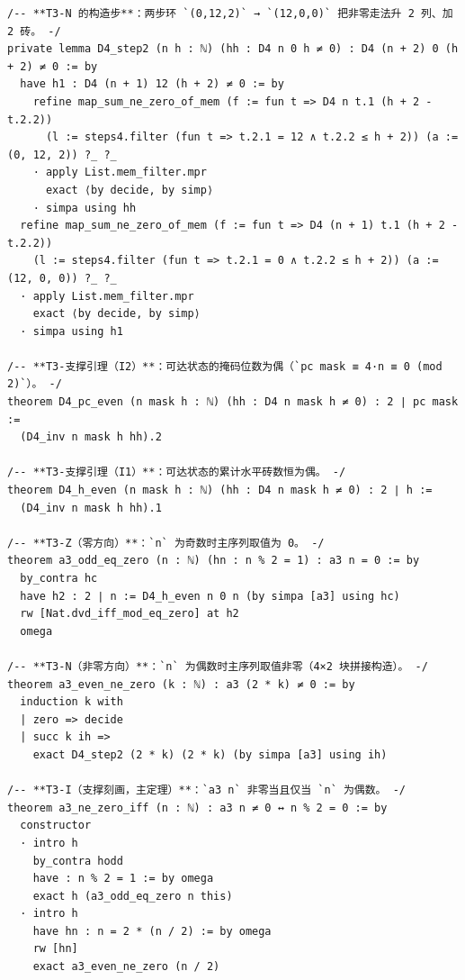 \documentclass[11pt]{article}
\begin{document}
\begin{lstlisting}[caption={Verbatim excerpt, lines 86--183 of \texttt{final/03-half4-proved.lean} (183 lines, sha256 \texttt{548f3ef5}...); the full text is in the deposit's \texttt{proofs/}.},label={lst:proof}]
/-- **T3-N 的构造步**：两步环 `(0,12,2)` → `(12,0,0)` 把非零走法升 2 列、加 2 砖。 -/
private lemma D4_step2 (n h : ℕ) (hh : D4 n 0 h ≠ 0) : D4 (n + 2) 0 (h + 2) ≠ 0 := by
  have h1 : D4 (n + 1) 12 (h + 2) ≠ 0 := by
    refine map_sum_ne_zero_of_mem (f := fun t => D4 n t.1 (h + 2 - t.2.2))
      (l := steps4.filter (fun t => t.2.1 = 12 ∧ t.2.2 ≤ h + 2)) (a := (0, 12, 2)) ?_ ?_
    · apply List.mem_filter.mpr
      exact ⟨by decide, by simp⟩
    · simpa using hh
  refine map_sum_ne_zero_of_mem (f := fun t => D4 (n + 1) t.1 (h + 2 - t.2.2))
    (l := steps4.filter (fun t => t.2.1 = 0 ∧ t.2.2 ≤ h + 2)) (a := (12, 0, 0)) ?_ ?_
  · apply List.mem_filter.mpr
    exact ⟨by decide, by simp⟩
  · simpa using h1

/-- **T3-支撑引理（I2）**：可达状态的掩码位数为偶（`pc mask ≡ 4·n ≡ 0 (mod 2)`）。 -/
theorem D4_pc_even (n mask h : ℕ) (hh : D4 n mask h ≠ 0) : 2 ∣ pc mask :=
  (D4_inv n mask h hh).2

/-- **T3-支撑引理（I1）**：可达状态的累计水平砖数恒为偶。 -/
theorem D4_h_even (n mask h : ℕ) (hh : D4 n mask h ≠ 0) : 2 ∣ h :=
  (D4_inv n mask h hh).1

/-- **T3-Z（零方向）**：`n` 为奇数时主序列取值为 0。 -/
theorem a3_odd_eq_zero (n : ℕ) (hn : n % 2 = 1) : a3 n = 0 := by
  by_contra hc
  have h2 : 2 ∣ n := D4_h_even n 0 n (by simpa [a3] using hc)
  rw [Nat.dvd_iff_mod_eq_zero] at h2
  omega

/-- **T3-N（非零方向）**：`n` 为偶数时主序列取值非零（4×2 块拼接构造）。 -/
theorem a3_even_ne_zero (k : ℕ) : a3 (2 * k) ≠ 0 := by
  induction k with
  | zero => decide
  | succ k ih =>
    exact D4_step2 (2 * k) (2 * k) (by simpa [a3] using ih)

/-- **T3-I（支撑刻画，主定理）**：`a3 n` 非零当且仅当 `n` 为偶数。 -/
theorem a3_ne_zero_iff (n : ℕ) : a3 n ≠ 0 ↔ n % 2 = 0 := by
  constructor
  · intro h
    by_contra hodd
    have : n % 2 = 1 := by omega
    exact h (a3_odd_eq_zero n this)
  · intro h
    have hn : n = 2 * (n / 2) := by omega
    rw [hn]
    exact a3_even_ne_zero (n / 2)
\end{lstlisting}
\end{document}
